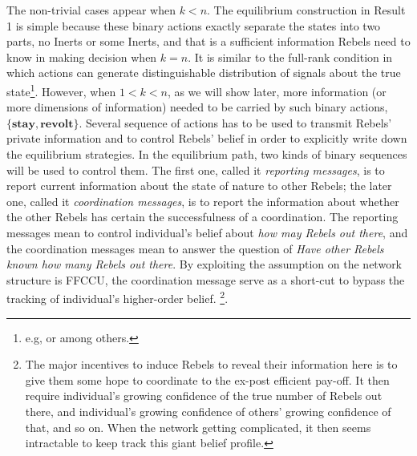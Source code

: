 \documentclass[12pt,letter]{article}
\theoremstyle{definition}
\theoremstyle{remark}
\theoremstyle{claim}
\begin{document}
The non-trivial cases appear when $k<n$. The equilibrium construction in Result 1 is simple because these binary actions exactly separate the states into two parts, no Inerts or some Inerts, and that is a sufficient information Rebels need to know in making decision when $k=n$. It is similar to the full-rank condition in which actions can generate distinguishable distribution of signals about the true state\footnote{e.g, \citep{Fudenberg2010} or \citep{Fudenberg2011} among others.}. However, when $1<k<n$, as we will show later, more information (or more dimensions of information) needed to be carried by such binary actions, $\{\textbf{stay},\textbf{revolt}\}$. Several sequence of actions has to be used to transmit Rebels' private information and to control Rebels' belief in order to explicitly write down the equilibrium strategies. In the equilibrium path, two kinds of binary sequences will be used to control them. The first one, called it \textit{reporting messages}, is to report current information about the state of nature to other Rebels; the later one, called it \textit{coordination messages}, is to report the information about whether the other Rebels has certain the successfulness of a coordination. The reporting messages mean to control individual's belief about \textit{how may Rebels out there}, and the  coordination messages mean to answer the question of \textit{Have other Rebels known how many Rebels out there}. By exploiting the assumption on the network structure is FFCCU, the coordination message serve as a short-cut to bypass the tracking of individual's higher-order belief. \footnote{The major incentives to induce Rebels to reveal their information here is to give them some hope to coordinate to the ex-post efficient pay-off. It then require individual's growing confidence of the true number of Rebels out there, and individual's growing confidence of others' growing confidence of that, and so on. When the network getting complicated, it then seems intractable to keep track this giant belief profile.}. 
\end{document}
